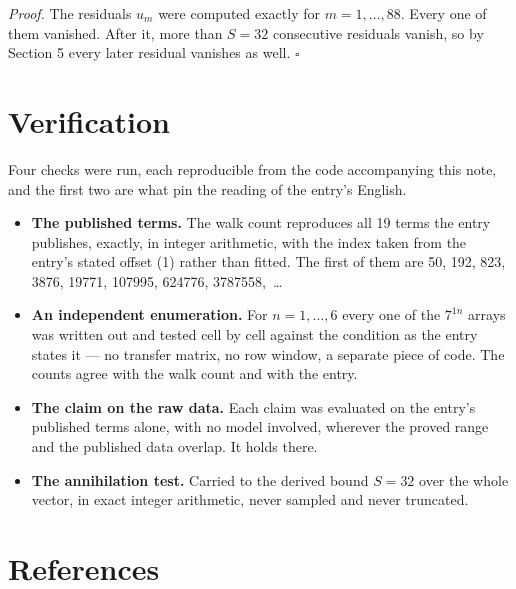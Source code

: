 \documentclass[11pt]{article}
\theoremstyle{definition}
\begin{document}
{\itshape Proof.} The residuals $u_m$ were computed exactly for $m = 1,\dots,88$. Every one of them vanished. After it, more than $S = 32$ consecutive residuals vanish, so by Section 5 every later residual vanishes as well. $\square$

\section{Verification}

Four checks were run, each reproducible from the code accompanying this note, and the first two are what pin the reading of the entry's English.

\begin{itemize}

\item {\bfseries The published terms.} The walk count reproduces all 19 terms the entry publishes, exactly, in integer arithmetic, with the index taken from the entry's stated offset (1) rather than fitted. The first of them are 50, 192, 823, 3876, 19771, 107995, 624776, 3787558,~\dots

\item {\bfseries An independent enumeration.} For $n = 1,\dots,6$ every one of the $7^{1n}$ arrays was written out and tested cell by cell against the condition as the entry states it --- no transfer matrix, no row window, a separate piece of code. The counts agree with the walk count and with the entry.

\item {\bfseries The claim on the raw data.} Each claim was evaluated on the entry's published terms alone, with no model involved, wherever the proved range and the published data overlap. It holds there.

\item {\bfseries The annihilation test.} Carried to the derived bound $S = 32$ over the whole vector, in exact integer arithmetic, never sampled and never truncated.

\end{itemize}

\section{References}
\end{document}
